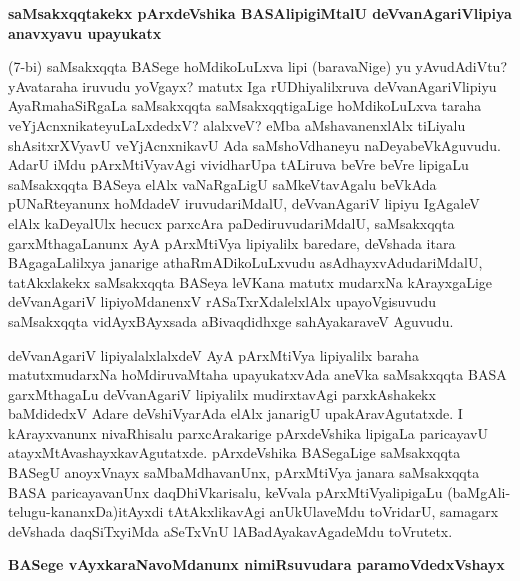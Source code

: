 \newpage

{\bigskip
\noindent
{\large\bf saMsakxqqtakekx pArxdeVshika BASAlipigiMtalU deVvanAgariVlipiya anavxyavu upayukatx}}
\medskip

\noindent
(7-bi) saMsakxqqta BASege hoMdikoLuLxva lipi (baravaNige) yu yAvu\-dAdiVtu? yAvataraha iru\-vudu yoVgayx? matutx Iga rUDhiyalilxruva deVvanAgariVlipiyu AyaRmahaSiRgaLa saMsakxqqta saMsakxqqti\-gaLige hoMdikoLuLxva taraha veYjAcnxnikateyuLaLxdedxV? alalxveV? eMba aMshavanenxlAlx tiLiyalu shAsitxrXV\-yavU veYjAcnxnikavU Ada saMshoVdhaneyu naDeyabeVkAguvudu. AdarU iMdu pArxMtiVya\-vAgi vividharUpa tALiruva beVre beVre lipigaLu saMsakxqqta BASeya elAlx vaNaRgaLigU saMkeVtavAgalu beVkAda pUNaRteyanunx hoMdadeV iruvudariMdalU, deVvanAgariV lipiyu IgAgaleV elAlx kaDe\-yalUlx hecucx parxcAra paDediruvudariMdalU, saMsakxqqta garxMthagaLanunx AyA pArxMtiVya lipiyalilx bare\-dare, deV\-shada itara BAgagaLalilxya janarige athaRmADikoLuLxvudu asAdhayxvAdudariMdalU, tatAkxlakekx saMsakxqqta
BASeya leVKana matutx mudarxNa kArayxgaLige deVvanAgariV lipiyoMdanenxV rASaTxrXdalelxlAlx upa\-yoVgisu\-vudu saMsakxqqta vidAyxBAyxsada aBivaqdidhxge sahAyakaraveV Aguvudu. 

deVvanAgariV lipiyalalxlalxdeV AyA pArxMtiVya lipiyalilx baraha matutx\break \hbox{mudarxNa} hoMdiru\-vaMtaha upayukatxvAda aneVka saMsakxqqta BASA garxMthagaLu deVva\-nAgariV lipiyalilx mudirxtavAgi parxkAshakekx baMdi\-dedxV Adare deVshiVyarAda elAlx janarigU upakAravAgutatxde. I kArayxvanunx nivaRhisalu parxcAraka\-rige pArxdeV\-shika lipigaLa paricayavU atayxMtAvashayxkavAgutatxde. pArxdeVshika BASegaLige saMsakxqqta BASegU anoyxVnayx saMbaMdhavanUnx, pArxMtiVya janara saMsakxqqta BASA paricaya\-vanUnx daqDhiVkarisalu, keVvala pArxMtiVya\-lipigaLu (baMgAli-telugu-kananxDa)\break itAyxdi tAtAkxlikavAgi anUkUlaveMdu toVridarU, sama\-garx \-deVshada daqSiTxyiMda aSeTxVnU lABadAyakavAgadeMdu toVrutetx.

{\bigskip
\noindent
{\large\bf BASege vAyxkaraNavoMdanunx nimiRsuvudara paramoVdedxVshayx}}\label{page34}
\medskip

